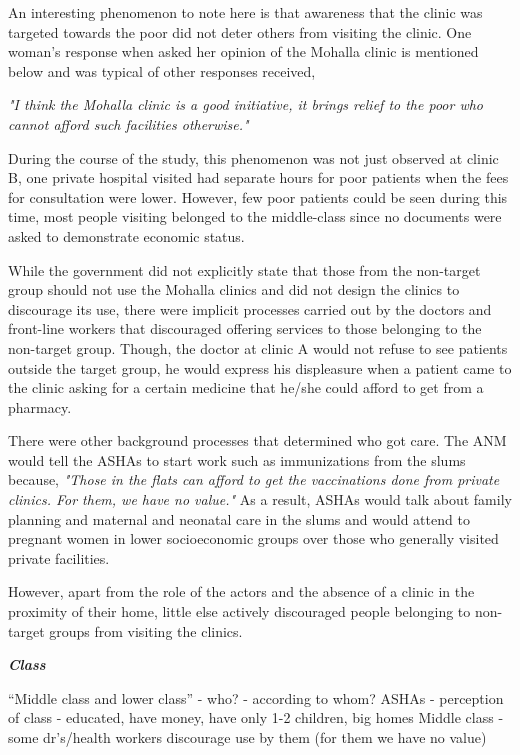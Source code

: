 An interesting phenomenon to note here is that awareness that the clinic was targeted towards the poor did not deter others from visiting the clinic. One woman's response when asked her opinion of the Mohalla clinic is mentioned below and was typical of other responses received, 

\textit{"I think the Mohalla clinic is a good initiative, it brings relief to the poor who cannot afford such facilities otherwise."}

During the course of the study, this phenomenon was not just observed at clinic B, one private hospital visited had separate hours for poor patients when the fees for consultation were lower. However, few poor patients could be seen during this time, most people visiting belonged to the middle-class since no documents were asked to demonstrate economic status.

While the government did not explicitly state that those from the non-target group should not use the Mohalla clinics and did not design the clinics to discourage its use, there were implicit processes carried out by the doctors and front-line workers that discouraged offering services to those belonging to the non-target group. Though, the doctor at clinic A would not refuse to see patients outside the target group, he would express his displeasure when a patient came to the clinic asking for a certain medicine that he/she could afford to get from a pharmacy. %

There were other background processes that determined who got care. The ANM would tell the ASHAs to start work such as immunizations from the slums because, \textit{"Those in the flats can afford to get the vaccinations done from private clinics. For them, we have no value."} As a result, ASHAs would talk about family planning and maternal and neonatal care in the slums and would attend to pregnant women in lower socioeconomic groups over those who generally visited private facilities. %

However, apart from the role of the actors and the absence of a clinic in the proximity of their home, little else actively discouraged people belonging to non-target groups from visiting the clinics.

\textbf{\textit{Class}}

“Middle class and lower class” - who? - according to whom?
ASHAs - perception of class - educated, have money, have only 1-2 children, big homes
Middle class - some dr’s/health workers discourage use by them (for them we have no value)

